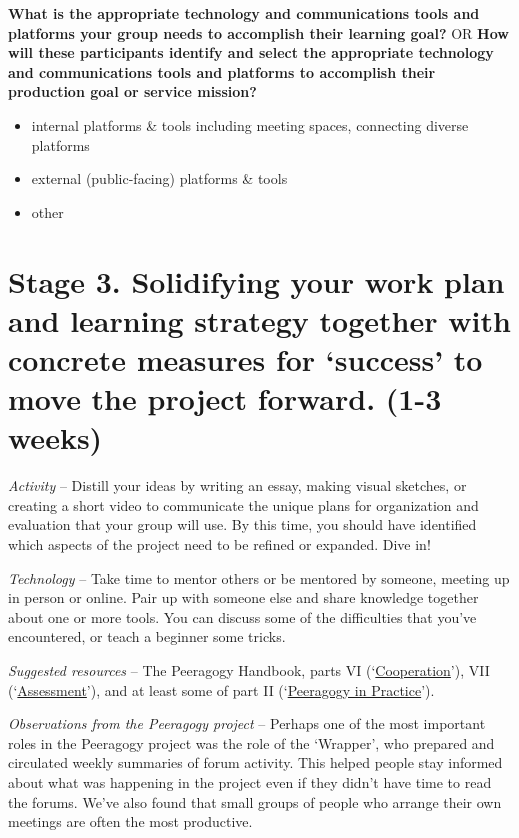 \textbf{What is the appropriate technology and communications tools and
platforms your group needs to accomplish their learning goal?} OR
\textbf{How will these participants identify and select the appropriate
technology and communications tools and platforms to accomplish their
production goal or service mission?}

\begin{itemize}
\itemsep1pt\parskip0pt
\item
  internal platforms \& tools including meeting spaces, connecting
  diverse platforms
\item
  external (public-facing) platforms \& tools
\item
  other
\end{itemize}

\section*{Stage 3. Solidifying your work plan and learning strategy
together with concrete measures for `success' to move the project
forward. (1-3
weeks)}\label{stage-3.-solidifying-your-work-plan-and-learning-strategy-together-with-concrete-measures-for-success-to-move-the-project-forward.-1-3-weeks}

\emph{Activity} -- Distill your ideas by writing an essay, making visual
sketches, or creating a short video to communicate the unique plans for
organization and evaluation that your group will use. By this time, you
should have identified which aspects of the project need to be refined
or expanded. Dive in!

\emph{Technology} -- Take time to mentor others or be mentored by
someone, meeting up in person or online. Pair up with someone else and
share knowledge together about one or more tools. You can discuss some
of the difficulties that you've encountered, or teach a beginner some
tricks.

\emph{Suggested resources} -- The Peeragogy Handbook, parts VI
(`\href{http://peeragogy.org/co-facilitation/}{Cooperation}'), VII
(`\href{http://peeragogy.org/assessment/}{Assessment}'), and at least
some of part II
(`\href{http://peeragogy.org/patterns-usecases/}{Peeragogy in
Practice}').

\emph{Observations from the Peeragogy project} -- Perhaps one of the
most important roles in the Peeragogy project was the role of the
`Wrapper', who prepared and circulated weekly summaries of forum
activity. This helped people stay informed about what was happening in
the project even if they didn't have time to read the forums. We've also
found that small groups of people who arrange their own meetings are
often the most productive.

